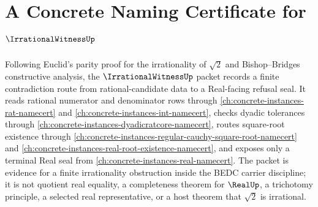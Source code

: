 \chapter{A Concrete Naming Certificate for $\IrrationalWitnessUp$}
\label{ch:concrete-instances-irrational-witness-namecert}

Following Euclid's parity proof for the irrationality of $\sqrt{2}$ and Bishop--Bridges constructive analysis, the $\IrrationalWitnessUp$ packet records a finite contradiction route from rational-candidate data to a Real-facing refusal seal. It reads rational numerator and denominator rows through \autoref{ch:concrete-instances-rat-namecert} and \autoref{ch:concrete-instances-int-namecert}, checks dyadic tolerances through \autoref{ch:concrete-instances-dyadicratcore-namecert}, routes square-root existence through \autoref{ch:concrete-instances-regular-cauchy-square-root-namecert} and \autoref{ch:concrete-instances-real-root-existence-namecert}, and exposes only a terminal Real seal from \autoref{ch:concrete-instances-real-namecert}. The packet is evidence for a finite irrationality obstruction inside the BEDC carrier discipline; it is not quotient real equality, a completeness theorem for $\RealUp$, a trichotomy principle, a selected real representative, or a host theorem that $\sqrt{2}$ is irrational.

